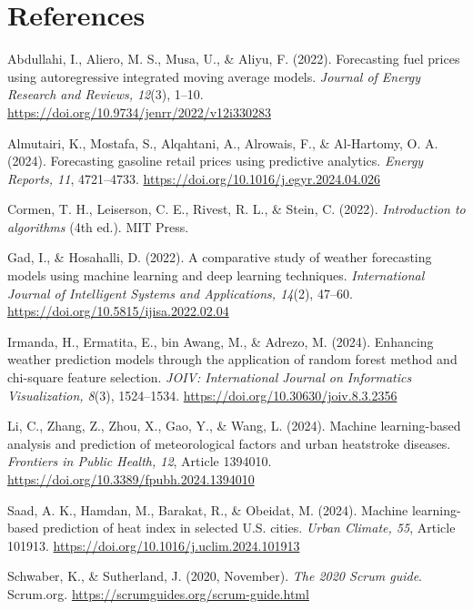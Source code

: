 \documentclass[12pt]{article}
\begin{document}
\newpage
\section{References}
\begingroup
\setlength{\parindent}{-2em}
\setlength{\leftskip}{2em}
\setlength{\parskip}{6pt}
\onehalfspacing

Abdullahi, I., Aliero, M. S., Musa, U., \& Aliyu, F. (2022). Forecasting fuel prices using autoregressive integrated moving average models. \textit{Journal of Energy Research and Reviews, 12}(3), 1--10. \url{https://doi.org/10.9734/jenrr/2022/v12i330283}

Almutairi, K., Mostafa, S., Alqahtani, A., Alrowais, F., \& Al-Hartomy, O. A. (2024). Forecasting gasoline retail prices using predictive analytics. \textit{Energy Reports, 11}, 4721--4733. \url{https://doi.org/10.1016/j.egyr.2024.04.026}

Cormen, T. H., Leiserson, C. E., Rivest, R. L., \& Stein, C. (2022). \textit{Introduction to algorithms} (4th ed.). MIT Press.

Gad, I., \& Hosahalli, D. (2022). A comparative study of weather forecasting models using machine learning and deep learning techniques. \textit{International Journal of Intelligent Systems and Applications, 14}(2), 47--60. \url{https://doi.org/10.5815/ijisa.2022.02.04}

Irmanda, H., Ermatita, E., bin Awang, M., \& Adrezo, M. (2024). Enhancing weather prediction models through the application of random forest method and chi-square feature selection. \textit{JOIV: International Journal on Informatics Visualization, 8}(3), 1524--1534. \url{https://doi.org/10.30630/joiv.8.3.2356}

Li, C., Zhang, Z., Zhou, X., Gao, Y., \& Wang, L. (2024). Machine learning-based analysis and prediction of meteorological factors and urban heatstroke diseases. \textit{Frontiers in Public Health, 12}, Article 1394010. \url{https://doi.org/10.3389/fpubh.2024.1394010}

Saad, A. K., Hamdan, M., Barakat, R., \& Obeidat, M. (2024). Machine learning-based prediction of heat index in selected U.S. cities. \textit{Urban Climate, 55}, Article 101913. \url{https://doi.org/10.1016/j.uclim.2024.101913}

Schwaber, K., \& Sutherland, J. (2020, November). \textit{The 2020 Scrum guide}. Scrum.org. \url{https://scrumguides.org/scrum-guide.html}

\endgroup
\end{document}
